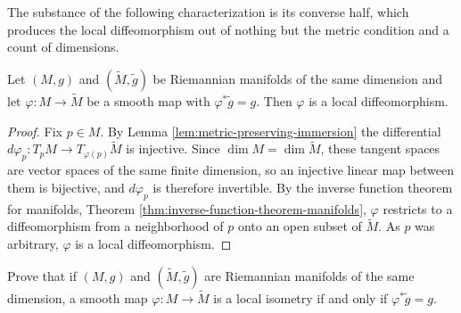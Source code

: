 The substance of the following characterization is its converse half, which produces the local diffeomorphism out of nothing but the metric condition and a count of dimensions.

\begin{lemma}
\label{lem:metric-preserving-equidim-local-diffeomorphism}
\leanok
{}
Let $(M,g)$ and $(\widetilde{M},\widetilde{g})$ be Riemannian manifolds of the same dimension and let $\varphi: M \to \widetilde{M}$ be a smooth map with $\varphi^* \widetilde{g} = g$. Then $\varphi$ is a local diffeomorphism.
\end{lemma}

\begin{proof}
\leanok
{}
Fix $p \in M$. By Lemma \ref{lem:metric-preserving-immersion} the differential $d\varphi_p : T_p M \to T_{\varphi(p)}\widetilde{M}$ is injective. Since $\dim M = \dim \widetilde{M}$, these tangent spaces are vector spaces of the same finite dimension, so an injective linear map between them is bijective, and $d\varphi_p$ is therefore invertible. By the inverse function theorem for manifolds, Theorem \ref{thm:inverse-function-theorem-manifolds}, $\varphi$ restricts to a diffeomorphism from a neighborhood of $p$ onto an open subset of $\widetilde{M}$. As $p$ was arbitrary, $\varphi$ is a local diffeomorphism.
\end{proof}

\begin{exercise}
\label{exer:characterize-local-isometry}
\leanok
{}
Prove that if $(M,g)$ and $(\widetilde{M}, \widetilde{g})$ are Riemannian manifolds of the same dimension, a smooth map $\varphi: M \to \widetilde{M}$ is a local isometry if and only if $\varphi^* \widetilde{g} = g$.
\end{exercise}

